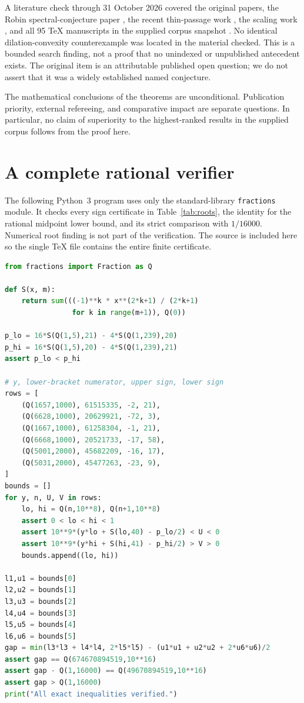 \documentclass[11pt,a4paper]{article}
\theoremstyle{definition}\newtheorem{definition}[theorem]{Definition}
\theoremstyle{remark}\newtheorem{remark}[theorem]{Remark}
\begin{document}
A literature check through 31 October 2026 covered the original
papers, the Robin spectral-conjecture paper \cite{Laugesen2019},
the recent thin-passage work \cite{DS2026}, the scaling work
\cite{Harman2025}, and all 95 TeX manuscripts in the supplied
corpus snapshot \cite{Corpus}. No identical dilation-convexity
counterexample was located in the material checked. This is a
bounded search finding, not a proof that no unindexed or
unpublished antecedent exists. The original item is an
attributable published open question; we do not assert that it
was a widely established named conjecture.

The mathematical conclusions of the theorems are unconditional.
Publication priority, external refereeing, and comparative impact
are separate questions. In particular, no claim of superiority
to the highest-ranked results in the supplied corpus follows
from the proof here.

\appendix
\section{A complete rational verifier}
\label{app:code}

The following Python~3 program uses only the standard-library
\texttt{fractions} module. It checks every sign certificate in
Table~\ref{tab:roots}, the identity for the rational midpoint
lower bound, and its strict comparison with $1/16000$. Numerical
root finding is not part of the verification. The source is
included here so the single TeX file contains the entire finite
certificate.

\begin{lstlisting}[language=Python]
from fractions import Fraction as Q

def S(x, m):
    return sum(((-1)**k * x**(2*k+1) / (2*k+1)
                for k in range(m+1)), Q(0))

p_lo = 16*S(Q(1,5),21) - 4*S(Q(1,239),20)
p_hi = 16*S(Q(1,5),20) - 4*S(Q(1,239),21)
assert p_lo < p_hi

# y, lower-bracket numerator, upper sign, lower sign
rows = [
    (Q(1657,1000), 61515335, -2, 21),
    (Q(6628,1000), 20629921, -72, 3),
    (Q(1667,1000), 61258304, -1, 21),
    (Q(6668,1000), 20521733, -17, 58),
    (Q(5001,2000), 45682209, -16, 17),
    (Q(5031,2000), 45477263, -23, 9),
]
bounds = []
for y, n, U, V in rows:
    lo, hi = Q(n,10**8), Q(n+1,10**8)
    assert 0 < lo < hi < 1
    assert 10**9*(y*lo + S(lo,40) - p_lo/2) < U < 0
    assert 10**9*(y*hi + S(hi,41) - p_hi/2) > V > 0
    bounds.append((lo, hi))

l1,u1 = bounds[0]
l2,u2 = bounds[1]
l3,u3 = bounds[2]
l4,u4 = bounds[3]
l5,u5 = bounds[4]
l6,u6 = bounds[5]
gap = min(l3*l3 + l4*l4, 2*l5*l5) - (u1*u1 + u2*u2 + 2*u6*u6)/2
assert gap == Q(674670894519,10**16)
assert gap - Q(1,16000) == Q(49670894519,10**16)
assert gap > Q(1,16000)
print("All exact inequalities verified.")
\end{lstlisting}
\end{document}
